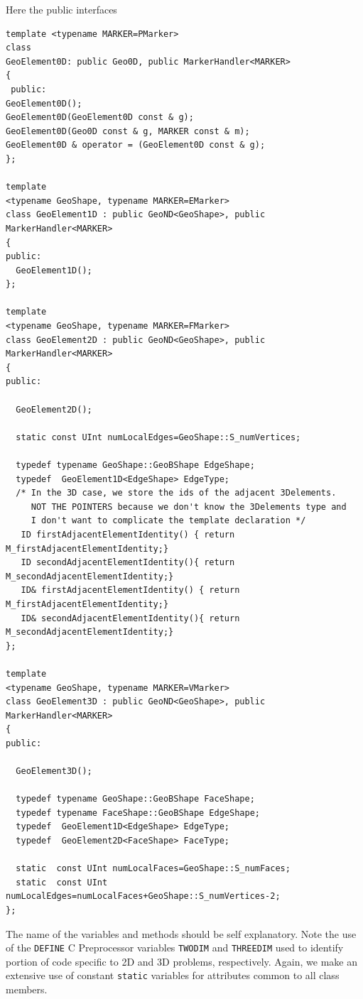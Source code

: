Here the public interfaces
\begin{verbatim}
template <typename MARKER=PMarker>
class 
GeoElement0D: public Geo0D, public MarkerHandler<MARKER>
{
 public:
GeoElement0D();
GeoElement0D(GeoElement0D const & g);
GeoElement0D(Geo0D const & g, MARKER const & m);
GeoElement0D & operator = (GeoElement0D const & g);
};

template 
<typename GeoShape, typename MARKER=EMarker>
class GeoElement1D : public GeoND<GeoShape>, public MarkerHandler<MARKER>
{
public:
  GeoElement1D();
};

template 
<typename GeoShape, typename MARKER=FMarker>
class GeoElement2D : public GeoND<GeoShape>, public MarkerHandler<MARKER>
{
public:

  GeoElement2D();

  static const UInt numLocalEdges=GeoShape::S_numVertices;

  typedef typename GeoShape::GeoBShape EdgeShape;
  typedef  GeoElement1D<EdgeShape> EdgeType;
  /* In the 3D case, we store the ids of the adjacent 3Delements.
     NOT THE POINTERS because we don't know the 3Delements type and 
     I don't want to complicate the template declaration */
   ID firstAdjacentElementIdentity() { return M_firstAdjacentElementIdentity;}
   ID secondAdjacentElementIdentity(){ return M_secondAdjacentElementIdentity;}
   ID& firstAdjacentElementIdentity() { return M_firstAdjacentElementIdentity;}
   ID& secondAdjacentElementIdentity(){ return M_secondAdjacentElementIdentity;}
};

template 
<typename GeoShape, typename MARKER=VMarker>
class GeoElement3D : public GeoND<GeoShape>, public MarkerHandler<MARKER>
{
public:
  
  GeoElement3D();

  typedef typename GeoShape::GeoBShape FaceShape;
  typedef typename FaceShape::GeoBShape EdgeShape;
  typedef  GeoElement1D<EdgeShape> EdgeType;
  typedef  GeoElement2D<FaceShape> FaceType;

  static  const UInt numLocalFaces=GeoShape::S_numFaces;
  static  const UInt numLocalEdges=numLocalFaces+GeoShape::S_numVertices-2;
};
\end{verbatim}
The name of the variables and methods should be self explanatory.
Note the use of the \texttt{DEFINE} C Preprocessor variables
\texttt{TWODIM} and \texttt{THREEDIM} used to identify portion of code
specific to 2D and 3D problems, respectively.  Again, we make an
extensive use of constant \texttt{static} variables for attributes
common to all class members. 

